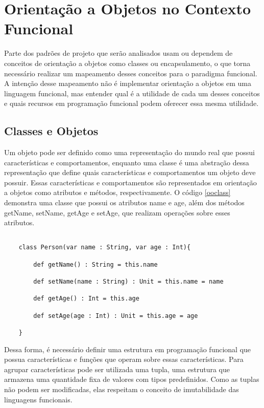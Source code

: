
\chapter{Orientação a Objetos no Contexto Funcional}


Parte dos padrões de projeto que serão 
analisados usam ou dependem de conceitos 
de orientação a objetos como classes ou 
encapsulamento, o que torna necessário 
realizar um mapeamento desses conceitos 
para o paradigma funcional. A intenção 
desse mapeamento não é implementar 
orientação a objetos em uma linguagem 
funcional, mas entender qual é a utilidade 
de cada um desses conceitos e quais 
recursos em programação funcional podem 
oferecer essa mesma utilidade.


\section{Classes e Objetos}

Um objeto pode ser definido como uma representação 
do mundo real que possui características e comportamentos, 
enquanto uma classe é uma abstração dessa representação 
que define quais características e comportamentos um objeto 
deve possuir\cite{umlsystems}. Essas características 
e comportamentos são representados em orientação a 
objetos como atributos e métodos, respectivamente. 
O código \ref{ooclass} demonstra uma classe que 
possui os atributos name e age, além dos métodos 
getName, setName, getAge e setAge, que realizam 
operações sobre esses atributos.

\begin{lstlisting}[caption={Classe comum em Orientação a Objetos},label=ooclass]
    
    class Person(var name : String, var age : Int){

        def getName() : String = this.name

        def setName(name : String) : Unit = this.name = name

        def getAge() : Int = this.age

        def setAge(age : Int) : Unit = this.age = age

    }   

\end{lstlisting}

Dessa forma, é necessário definir uma estrutura em 
programação funcional que possua características e 
funções que operam sobre essas características. 
Para agrupar características pode ser utilizada uma 
tupla, uma estrutura que armazena uma quantidade 
fixa de valores com tipos predefinidos\cite{tuplesscala}. 
Como as tuplas não podem ser modificadas, elas 
respeitam o conceito de imutabilidade das 
linguagens funcionais.

